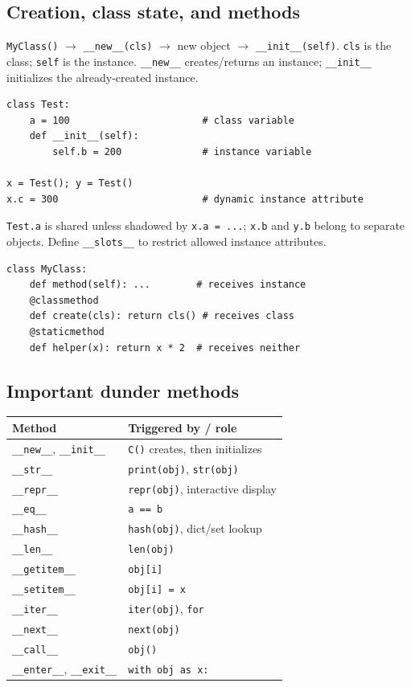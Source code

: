\documentclass[10pt,a4paper]{article}
\newcommand{\py}[1]{\texttt{#1}}
\newenvironment{tbl}{\par\begin{lrbox}{\tblbox}\begin{minipage}{\linewidth}\compacttable}%
  {\end{minipage}\end{lrbox}\noindent\raisebox{\dp\tblbox}{\usebox{\tblbox}}\par}
\newcommand{\compacttable}{\fontsize{10}{11.2}\selectfont\setlength{\tabcolsep}{2.5pt}\renewcommand{\arraystretch}{1.08}}
\begin{document}
\begin{multicols}{2}
\subsection{Creation, class state, and methods}

\py{MyClass()} $\rightarrow$ \py{\_\_new\_\_(cls)} $\rightarrow$ new object $\rightarrow$ \py{\_\_init\_\_(self)}. \py{cls} is the class; \py{self} is the instance. \py{\_\_new\_\_} creates/returns an instance; \py{\_\_init\_\_} initializes the already-created instance.

\begin{lstlisting}
class Test:
    a = 100                       # class variable
    def __init__(self):
        self.b = 200              # instance variable

x = Test(); y = Test()
x.c = 300                         # dynamic instance attribute
\end{lstlisting}

\py{Test.a} is shared unless shadowed by \py{x.a = ...}; \py{x.b} and \py{y.b} belong to separate objects. Define \py{\_\_slots\_\_} to restrict allowed instance attributes.

\begin{lstlisting}
class MyClass:
    def method(self): ...        # receives instance
    @classmethod
    def create(cls): return cls() # receives class
    @staticmethod
    def helper(x): return x * 2  # receives neither
\end{lstlisting}

\subsection{Important dunder methods}

\begin{tbl}
\begin{tabularx}{\linewidth}{@{}R{.39\linewidth}L@{}}
\toprule
\textbf{Method} & \textbf{Triggered by / role} \\
\midrule
\py{\_\_new\_\_}, \py{\_\_init\_\_} & \py{C()} creates, then initializes \\
\py{\_\_str\_\_} & \py{print(obj)}, \py{str(obj)} \\
\py{\_\_repr\_\_} & \py{repr(obj)}, interactive display \\
\py{\_\_eq\_\_} & \py{a == b} \\
\py{\_\_hash\_\_} & \py{hash(obj)}, dict/set lookup \\
\py{\_\_len\_\_} & \py{len(obj)} \\
\py{\_\_getitem\_\_} & \py{obj[i]} \\
\py{\_\_setitem\_\_} & \py{obj[i] = x} \\
\py{\_\_iter\_\_} & \py{iter(obj)}, \py{for} \\
\py{\_\_next\_\_} & \py{next(obj)} \\
\py{\_\_call\_\_} & \py{obj()} \\
\py{\_\_enter\_\_}, \py{\_\_exit\_\_} & \py{with obj as x:} \\
\bottomrule
\end{tabularx}
\end{tbl}


\end{multicols}
\end{document}

